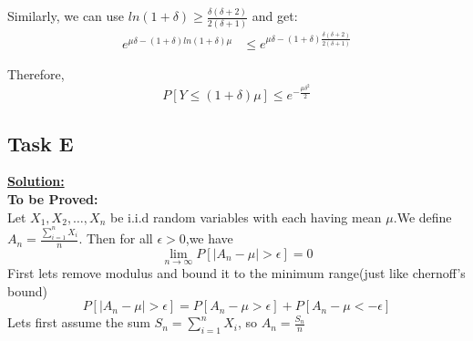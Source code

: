 \documentclass[12pt]{article}
\begin{document}
\begin{enumerate}
\begin{itemize}
Similarly, we can use $ln(1+\delta) \geq \frac{\delta(\delta+2)}{2(\delta+1)}$ and get:
\begin{equation}
\begin{split}
      e^{\mu\delta-(1+\delta)ln(1+\delta)\mu}& \leq e^{\mu\delta-(1+\delta)\frac{\delta(\delta+2)}{2(\delta+1)}}
\end{split}
\end{equation}

Therefore,
\begin{equation}
    P[Y \leq (1+\delta)\mu] \leq e^{-\frac{\mu\delta^2}{2}}
\end{equation}
\end{itemize}
\end{enumerate}

\subsection{Task E} 
\textbf{\underline{Solution:}}\\
\textbf{To be Proved:}\\
Let $X_1,X_2,\dots,X_n$ be i.i.d random variables with each having mean $ \mu $.We define $ A_n = \frac{\sum_{i=1}^nX_i}{n} $. Then for all $ \epsilon > 0 $,we have
\begin{equation}
    \lim_{n\to\infty}P[|A_n - \mu| > \epsilon] = 0
\end{equation}
First lets remove modulus and bound it to the minimum range(just like chernoff's bound)
\begin{equation}
    P[|A_n - \mu| > \epsilon] = P[A_n - \mu > \epsilon] + P[A_n - \mu < -\epsilon]
\end{equation}
Lets first assume the sum $ S_n = \sum_{i=1}^{n}X_i$, so $A_n = \frac{S_n}{n}$
\end{document}
